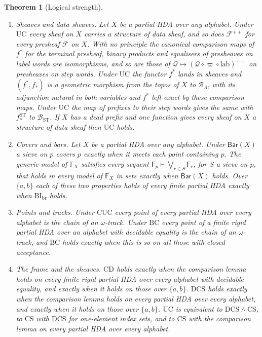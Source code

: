 \documentclass{lmcs}
\newtheorem{theorem}{Theorem}[section]
\theoremstyle{definition}
\theoremstyle{remark}
\newcommand{\ab}{\{a,b\}}
\newcommand{\prin}[1]{\mathrm{#1}}
\newcommand{\UC}{\prin{UC}}
\newcommand{\CD}{\prin{CD}}
\newcommand{\Der}{\vdash}
\newcommand{\FX}[1]{\mathbb{F}_{#1}}
\newcommand{\fat}[1]{\mathsf{F}_{#1}}
\newcommand{\lab}{\mathrm{lab}}
\newcommand{\BarS}[1]{\mathsf{Bar}(#1)}
\providecommand{\CUC}{\prin{CUC}}
\providecommand{\BC}{\prin{BC}}
\providecommand{\lab}{\mathrm{lab}}
\providecommand{\BL}{\mathcal{B}_{\Lambda}}
\providecommand{\BST}{\mathcal{B}_{\mathrm{ST}}}
\providecommand{\fgt}{\varpi}
\providecommand{\fin}{f^{\ast}}
\providecommand{\fsh}{f_{\ast}}
\providecommand{\BIb}{\prin{BI}_{\mathrm{br}}}
\providecommand{\CS}{\prin{CS}}
\providecommand{\DCS}{\prin{DCS}}
\providecommand{\CUC}{\prin{CUC}}
\providecommand{\BC}{\prin{BC}}
\providecommand{\fshS}{f^{\mathrm{ST}}_{\ast}}
\begin{document}
\begin{theorem}[Logical strength]\label{thm:prices}
\begin{enumerate}[label=(\arabic*),ref=\thetheorem(\arabic*)]
\item\label{thm:prices-uc} \emph{Sheaves and data sheaves.} Let $X$ be a partial HDA over any alphabet. Under
  $\UC$ every sheaf on $X$ carries a structure of data sheaf, and so does
  $\mathscr{F}^{++}$ for every presheaf $\mathscr{F}$ on $X$. With no principle
  the canonical comparison maps of $\fin$ for the terminal presheaf, binary products and equalisers of presheaves on
  label words are isomorphisms, and so are those of
  $\mathscr{Q}\mapsto(\mathscr{Q}\circ\fgt\circ\lab)^{++}$ on presheaves on step
  words. Under $\UC$ the functor $\fin$ lands in sheaves and
  $(\fin,\fsh)$ is a geometric morphism from the topos of $X$ to $\BL$, with its adjunction natural in both
  variables and $\fin$ left exact by these comparison maps. Under $\UC$ the
  map of prefixes to their step words gives the same with $\fshS$ to $\BST$. If $X$ has a dead prefix
  and one function gives every sheaf on $X$ a structure of data sheaf then
  $\UC$ holds.
\item\label{thm:setup-bar} \emph{Covers and bars.} Let $X$ be a partial HDA over any alphabet. Under $\BarS{X}$ a
  sieve on $p$ covers $p$ exactly when it meets each point containing $p$. The
  generic model of $\FX{X}$ satisfies every sequent $\fat{p}\Der\bigvee_{r\in S}\fat{r}$, for $S$ a sieve on $p$,
  that holds in every model of $\FX{X}$ in sets exactly when $\BarS{X}$ holds.
  Over $\ab$ each of these two properties holds of every finite partial HDA exactly when $\BIb$
  holds.
\item\label{thm:pt-track} \emph{Points and tracks.} Under $\CUC$ every point of every partial HDA over every
  alphabet is the chain of an $\omega$-track. Under $\BC$ every point of a
  finite rigid partial HDA over an alphabet with decidable equality is the chain of an
  $\omega$-track, and $\BC$ holds exactly when this is so on all those
  with closed acceptance.
\item\label{thm:setup-price} \emph{The frame and the sheaves.} $\CD$ holds exactly when the comparison lemma holds
  on every finite rigid partial HDA over every alphabet with decidable equality, and exactly when it holds on those
  over $\ab$. $\DCS$ holds exactly when the comparison lemma holds on every
  partial HDA over every alphabet, and exactly when it holds on those over $\ab$. $\UC$ is equivalent to $\DCS\wedge\CS$, to $\CS$ with $\DCS$ for
  one-element index sets, and to $\CS$ with the comparison lemma on every partial HDA over every
  alphabet.
\end{enumerate}
\end{theorem}
\end{document}
